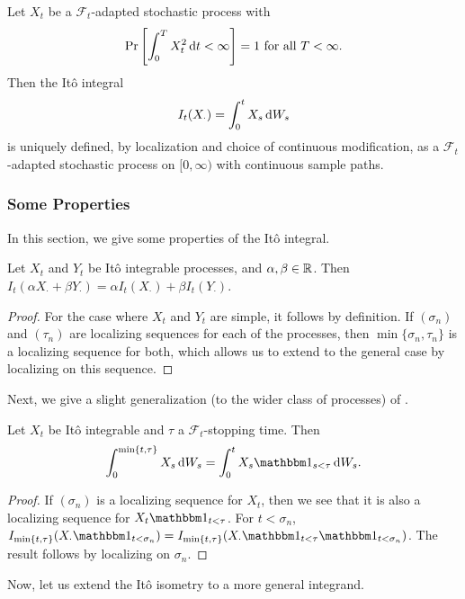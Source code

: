 \begin{fdef}[It\^{o} Integral]
	Let $X_t$ be a $\mathcal{F}_t$-adapted stochastic process with
	\[ \Pr\left[\int_0^T X_t^2\operatorname{d}\!{t} < \infty\right] = 1 \text{ for all } T<\infty. \]
	Then the It\^{o} integral
	\[ I_t(X_\cdot) = \int_0^t X_s\operatorname{d}\!{W}_s \]
	is uniquely defined, by localization and choice of continuous modification, as a $\mathcal{F}_t$-adapted stochastic process on $[0,\infty)$ with continuous sample paths.
\end{fdef}

\subsubsection{Some Properties}

In this section, we give some properties of the It\^{o} integral.

\begin{lemma}[Linearity]
	Let $X_t$ and $Y_t$ be It\^{o} integrable processes, and $\alpha,\beta\in\mathbb{R}$. Then $I_t(\alpha X_\cdot + \beta Y_\cdot) = \alpha I_t(X_\cdot) + \beta I_t(Y_\cdot)$.
\end{lemma}
\begin{proof}
	For the case where $X_t$ and $Y_t$ are simple, it follows by definition. If $(\sigma_n)$ and $(\tau_n)$ are localizing sequences for each of the processes, then $\min\{\sigma_n,\tau_n\}$ is a localizing sequence for both, which allows us to extend to the general case by localizing on this sequence.
\end{proof}

Next, we give a slight generalization (to the wider class of processes) of .

\begin{lemma}
	Let $X_t$ be It\^{o} integrable and $\tau$ a $\mathcal{F}_t$-stopping time. Then
	\[ \int_0^{\min\{t,\tau\}} X_s\d{W}_s = \int_0^t X_s \indic_{s<\tau}\d{W}_s. \]
\end{lemma}
\begin{proof}
	If $(\sigma_n)$ is a localizing sequence for $X_t$, then we see that it is also a localizing sequence for $X_t\indic_{t<\tau}$. For $t<\sigma_n$, $I_{\min\{t,\tau\}}(X_\cdot \indic_{t < \sigma_n}) = I_{\min\{t,\tau\}}(X_\cdot \indic_{t < \tau} \indic_{t < \sigma_n})$. The result follows by localizing on $\sigma_n$.
\end{proof}

Now, let us extend the It\^{o} isometry to a more general integrand.

